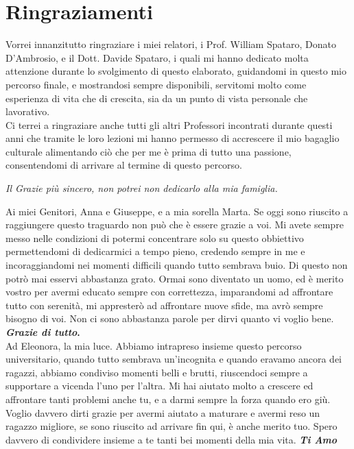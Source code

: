 \documentclass[tesi]{subfiles}
\begin{document}
\section*{Ringraziamenti}\label{sc:Ringraziamenti}
Vorrei innanzitutto ringraziare i miei relatori, i Prof. William Spataro, Donato D’Ambrosio, e il Dott. Davide Spataro, i quali mi hanno dedicato molta attenzione durante lo svolgimento di questo elaborato, guidandomi in questo mio percorso finale, e mostrandosi sempre disponibili, servitomi molto come esperienza di vita che di crescita, sia da un punto di vista personale che lavorativo.\\


Ci terrei a ringraziare anche tutti gli altri Professori incontrati durante questi anni che tramite le loro lezioni mi hanno permesso di accrescere il mio bagaglio culturale alimentando ciò che per me è prima di tutto una passione, consentendomi di arrivare al termine di questo percorso.\\

\begin{center}
\textit{Il Grazie più sincero, non potrei non dedicarlo alla mia famiglia.}\\
\end{center}

Ai miei Genitori, Anna e Giuseppe, e a mia sorella Marta. Se oggi sono riuscito a raggiungere questo traguardo non può che è essere grazie a voi. Mi avete sempre messo nelle condizioni di potermi concentrare solo su questo obbiettivo permettendomi di dedicarmici a tempo pieno, credendo sempre in me e incoraggiandomi nei momenti difficili quando tutto sembrava buio. Di questo non potrò mai esservi abbastanza grato. Ormai sono diventato un uomo, ed è merito vostro per avermi educato sempre con correttezza, imparandomi ad affrontare tutto con serenità, mi appresterò ad affrontare nuove sfide, ma avrò sempre bisogno di voi.
Non ci sono abbastanza parole per dirvi quanto vi voglio bene. \textbf{\textit{Grazie di tutto}.}\\


Ad Eleonora, la mia luce. Abbiamo intrapreso insieme questo percorso universitario, quando tutto sembrava un’incognita e quando eravamo ancora dei ragazzi, abbiamo condiviso momenti belli e brutti, riuscendoci sempre a supportare a vicenda l’uno per l’altra. Mi hai aiutato molto a crescere ed affrontare tanti problemi anche tu, e a darmi sempre la forza quando ero giù. Voglio davvero dirti grazie per avermi aiutato a maturare e avermi reso un ragazzo migliore, se sono riuscito ad arrivare fin qui, è anche merito tuo. Spero davvero di condividere insieme a te tanti bei momenti della mia vita. \textbf{\textit{Ti Amo}}\\
\end{document}
